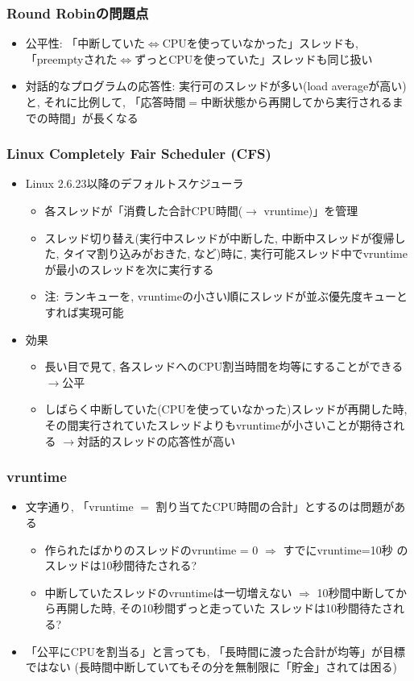 \documentclass[12pt,dvipdfmx]{beamer}
\begin{document}
\begin{frame}
  \frametitle{Round Robinの問題点}
  \begin{itemize}
  \item 公平性: 「中断していた$\iff$CPUを使っていなかった」スレッドも,
    「preemptyされた$\iff$ずっとCPUを使っていた」スレッドも同じ扱い
  \item 対話的なプログラムの応答性: 実行可のスレッドが多い(load averageが高い)と,
    それに比例して,
    「応答時間$=$中断状態から再開してから実行されるまでの時間」が長くなる
  \end{itemize}
\end{frame}

\begin{frame}
  \frametitle{Linux Completely Fair Scheduler (CFS)}
  \begin{itemize}
  \item Linux 2.6.23以降のデフォルトスケジューラ
    \begin{itemize}
    \item 各スレッドが「消費した合計CPU時間($\rightarrow$ vruntime)」を管理 
    \item スレッド切り替え(実行中スレッドが中断した,
      中断中スレッドが復帰した,
      タイマ割り込みがおきた, など)時に,
      実行可能スレッド中でvruntimeが最小のスレッドを次に実行する
    \item 注: ランキューを,
      vruntimeの小さい順にスレッドが並ぶ優先度キューとすれば実現可能
    \end{itemize}
  \item 効果
    \begin{itemize}
    \item 長い目で見て, 各スレッドへのCPU割当時間を均等にすることができる
      \mbox{$\rightarrow$公平}
    \item しばらく中断していた(CPUを使っていなかった)スレッドが再開した時,
      その間実行されていたスレッドよりもvruntimeが小さいことが期待される
      \mbox{$\rightarrow$対話的スレッドの応答性が高い}
    \end{itemize}
  \end{itemize}
\end{frame}

\begin{frame}
  \frametitle{vruntime}
  \begin{itemize}
  \item 文字通り, 「vruntime $=$ 割り当てたCPU時間の合計」とするのは問題がある
    \begin{itemize}
    \item 作られたばかりのスレッドのvruntime = 0 $\Rightarrow$ すでにvruntime=10秒
      のスレッドは10秒間待たされる?
    \item 中断していたスレッドのvruntimeは一切増えない
      $\Rightarrow$ 10秒間中断してから再開した時, その10秒間ずっと走っていた
      スレッドは10秒間待たされる?
    \end{itemize}
  \item 「公平にCPUを割当る」と言っても, 「長時間に渡った合計が均等」が目標ではない
    (長時間中断していてもその分を無制限に「貯金」されては困る)
  \end{itemize}
\end{frame}
\end{document}
